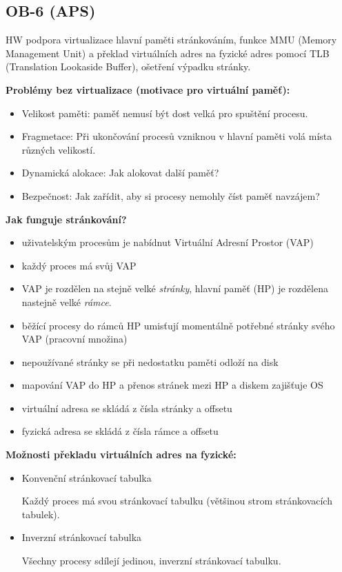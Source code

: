 \subsection{OB-6 (APS)}
\label{OB-6}
HW podpora virtualizace hlavní paměti stránkováním, funkce MMU (Memory Management Unit) a překlad virtuálních adres na fyzické adres pomocí TLB (Translation Lookaside Buffer), ošetření výpadku stránky.

\textbf{Problémy bez virtualizace (motivace pro virtuální paměť):}
\begin{itemize}
	\item Velikost paměti: paměť nemusí být dost velká pro spuštění procesu.
	\item Fragmetace: Při ukončování procesů vzniknou v hlavní paměti volá místa různých velikostí.
	\item Dynamická alokace: Jak alokovat další paměť?
	\item Bezpečnost: Jak zařídit, aby si procesy nemohly číst paměť navzájem?
\end{itemize}

\textbf{Jak funguje stránkování?}
\begin{itemize}
	\item uživatelským procesům je nabídnut Virtuální Adresní Prostor (VAP)
	\item každý proces má svůj VAP
	\item VAP je rozdělen na stejně velké \textit{stránky}, hlavní paměť (HP) je rozdělena nastejně velké \textit{rámce}.
	\item běžící procesy do rámců HP umisťují momentálně potřebné stránky svého VAP (pracovní množina)
	\item nepoužívané stránky se při nedostatku paměti odloží na disk
	\item mapování VAP do HP a přenos stránek mezi HP a diskem zajišťuje OS
	\item virtuální adresa se skládá z čísla stránky a offsetu
	\item fyzická adresa se skládá z čísla rámce a offsetu
\end{itemize}

\textbf{Možnosti překladu virtuálních adres na fyzické:}
\begin{itemize}
	\item Konvenční stránkovací tabulka
	
	Každý proces má svou stránkovací tabulku (většinou strom stránkovacích tabulek).	
	
	\item Inverzní stránkovací tabulka
	
	Všechny procesy sdílejí jedinou, inverzní stránkovací tabulku.
\end{itemize}

